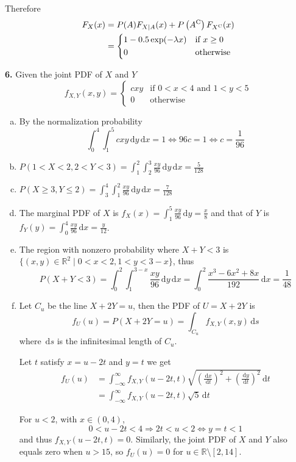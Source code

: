 \documentclass[a4paper,12pt]{article}
\newcommand{\C}{\mathrm C}
\newcommand{\ud}{\,\mathrm{d}}
\newcommand{\exercise}[1]{\noindent\textbf{#1.}}
\begin{document}
Therefore
\begin{align*}
  F_X(x) &= P(A)F_{X|A}(x) + P\left(A^\C\right)F_{X^\C}(x)\\
  &= \begin{dcases}
    1 - 0.5\exp(-\lambda x) &\text{if }x \ge 0\\
    0 &\text{otherwise}
  \end{dcases}
\end{align*}

\exercise 6  Given the joint PDF of $X$ and $Y$
\[f_{X,Y}(x, y) = \begin{cases}
  cxy &\text{if }0 < x < 4\text{ and }1 < y < 5\\
  0 &\text{otherwise}
\end{cases}\]
\begin{enumerate}[(a)]
  \item By the normalization probability
    \[\int_0^4\int_1^5 cxy\ud y\ud x = 1 \iff 96c = 1 \iff c = \frac{1}{96}\]
  \item $\displaystyle P(1 < X < 2, 2 < Y < 3)
    = \int_1^2\int_2^3\frac{xy}{96}\ud y\ud x = \frac{5}{128}$
  \item $\displaystyle P(X \ge 3, Y \le 2)
    = \int_3^4\int_1^2\frac{xy}{96}\ud y\ud x = \frac{7}{128}$
  \item The marginal PDF of $X$ is $\displaystyle f_X(x)
    = \int_1^5\frac{xy}{96}\ud y = \frac{x}{8}$ and that of $Y$ is
    $\displaystyle f_Y(y) = \int_0^4\frac{xy}{96}\ud x = \frac{y}{12}$.
  \item The region with nonzero probability where $X + Y < 3$ is
    $\{(x, y) \in \mathbb R^2 \mid 0 < x < 2, 1 < y < 3 - x\}$, thus
    \[P(X + Y < 3) = \int_0^2\int_1^{3-x}\frac{xy}{96}\ud y\ud x
    = \int_0^2\frac{x^3 - 6x^2 + 8x}{192}\ud x = \frac{1}{48}\]
  \item Let $C_u$ be the line $X + 2Y = u$, then the PDF of $U = X + 2Y$ is
    \[f_U(u) = P(X + 2Y = u) = \int_{C_u}f_{X,Y}(x, y)\ud s\]
    where $\ud s$ is the infinitesimal length of $C_u$.

    Let $t$ satisfy $x = u - 2t$ and $y = t$ we get
    \begin{align*}
      f_U(u) &= \int_{-\infty}^\infty f_{X,Y}(u - 2t, t)
      \sqrt{\left(\frac{\ud x}{\ud t}\right)^2
      + \left(\frac{\ud y}{\ud t}\right)^2}\ud t\\
      &= \int_{-\infty}^\infty f_{X,Y}(u - 2t, t)\sqrt 5\ud t
    \end{align*}

    For $u < 2$, with $x \in (0, 4)$,
    \[0 < u - 2t < 4 \Longrightarrow 2t < u < 2 \iff y = t < 1\]
    and thus $f_{X,Y}(u - 2t, t) = 0$.  Similarly, the joint PDF of $X$ and $Y$
    also equals zero when $u > 15$, so $f_U(u) = 0$
    for $u \in \mathbb R \setminus [2, 14]$.


\end{enumerate}
\end{document}
